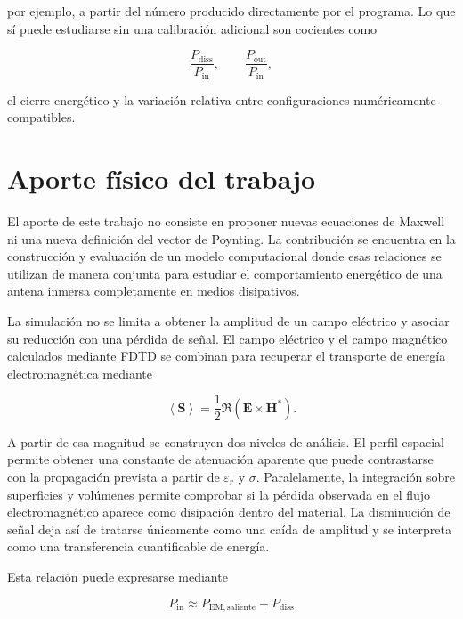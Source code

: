 por ejemplo, a partir del número producido directamente por el programa. Lo que sí puede estudiarse sin una calibración adicional son cocientes como

\begin{equation}
\frac{P_{\mathrm{diss}}}{P_{\mathrm{in}}},
\qquad
\frac{P_{\mathrm{out}}}{P_{\mathrm{in}}},
\end{equation}

el cierre energético y la variación relativa entre configuraciones numéricamente compatibles.

\section{Aporte físico del trabajo}

El aporte de este trabajo no consiste en proponer nuevas ecuaciones de Maxwell ni una nueva definición del vector de Poynting. La contribución se encuentra en la construcción y evaluación de un modelo computacional donde esas relaciones se utilizan de manera conjunta para estudiar el comportamiento energético de una antena inmersa completamente en medios disipativos.

La simulación no se limita a obtener la amplitud de un campo eléctrico y asociar su reducción con una pérdida de señal. El campo eléctrico y el campo magnético calculados mediante FDTD se combinan para recuperar el transporte de energía electromagnética mediante

\begin{equation}
\left\langle
\mathbf{S}
\right\rangle
=
\frac{1}{2}
\Re
\left(
\mathbf{E}\times\mathbf{H}^{*}
\right).
\end{equation}

A partir de esa magnitud se construyen dos niveles de análisis. El perfil espacial permite obtener una constante de atenuación aparente que puede contrastarse con la propagación prevista a partir de $\varepsilon_r$ y $\sigma$. Paralelamente, la integración sobre superficies y volúmenes permite comprobar si la pérdida observada en el flujo electromagnético aparece como disipación dentro del material. La disminución de señal deja así de tratarse únicamente como una caída de amplitud y se interpreta como una transferencia cuantificable de energía.

Esta relación puede expresarse mediante

\begin{equation}
\boxed{
P_{\mathrm{in}}
\approx
P_{\mathrm{EM,saliente}}
+
P_{\mathrm{diss}}
}
\end{equation}

